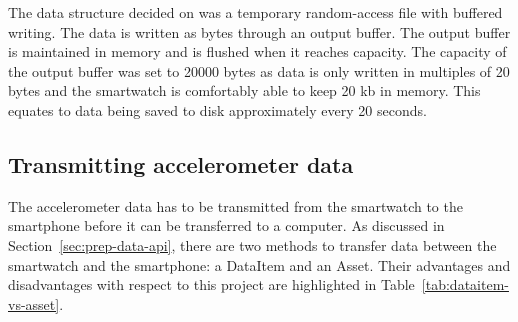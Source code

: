       The data structure decided on was a temporary random-access file with buffered writing. The data is written as bytes through an output buffer. The output buffer is maintained in memory and is flushed when it reaches capacity. The capacity of the output buffer was set to 20000 bytes as data is only written in multiples of 20 bytes and the smartwatch is comfortably able to keep 20 kb in memory. This equates to data being saved to disk approximately every 20 seconds.
      
    \subsection{Transmitting accelerometer data}
      The accelerometer data has to be transmitted from the smartwatch to the smartphone before it can be transferred to a computer. As discussed in Section~\ref{sec:prep-data-api}, there are two methods to transfer data between the smartwatch and the smartphone: a DataItem and an Asset. Their advantages and disadvantages with respect to this project are highlighted in Table~\ref{tab:dataitem-vs-asset}.
      
